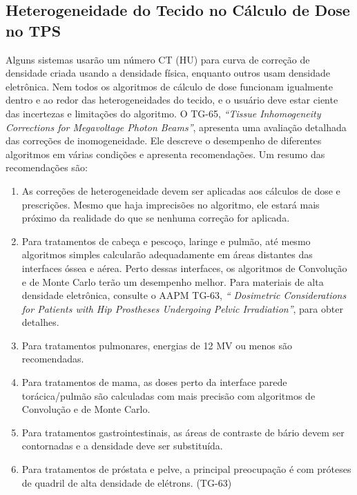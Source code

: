 \documentclass[11pt,a4paper]{article}
\begin{document}
\subsection*{Heterogeneidade do Tecido no Cálculo de Dose no TPS}

	Alguns sistemas usarão um número CT (HU) para curva de correção de densidade criada usando a densidade física, enquanto outros usam densidade eletrônica. Nem todos os algoritmos de cálculo de dose funcionam igualmente dentro e ao redor das heterogeneidades do tecido, e o usuário deve estar ciente das incertezas e limitações do algoritmo. O TG-65, \textit{``Tissue Inhomogeneity Corrections for Megavoltage Photon Beams''}, apresenta uma avaliação detalhada das correções de inomogeneidade. Ele descreve o desempenho de diferentes algoritmos em várias condições e apresenta recomendações. Um resumo das recomendações são:

	\begin{enumerate}[label=\textcolor{CarnationPink}{\roman*.}]
		\item As correções de heterogeneidade devem ser aplicadas aos cálculos de dose e prescrições. Mesmo que haja imprecisões no algoritmo, ele estará mais próximo da realidade do que se nenhuma correção for aplicada.
		
		\item Para tratamentos de cabeça e pescoço, laringe e pulmão, até mesmo algoritmos simples calcularão adequadamente em áreas distantes das interfaces óssea e aérea. Perto dessas interfaces, os algoritmos de Convolução e de Monte Carlo terão um desempenho melhor. Para materiais de alta densidade eletrônica, consulte o AAPM TG-63, \textit{`` Dosimetric Considerations for Patients with Hip Prostheses Undergoing Pelvic Irradiation''}, para obter detalhes.
		
		\item Para tratamentos pulmonares, energias de 12 MV ou menos são recomendadas.
		
		\item Para tratamentos de mama, as doses perto da interface parede torácica/pulmão são calculadas com mais precisão com algoritmos de Convolução e de Monte Carlo.
		
		\item Para tratamentos gastrointestinais, as áreas de contraste de bário devem ser contornadas e a densidade deve ser substituída.
		
		\item Para tratamentos de próstata e pelve, a principal preocupação é com próteses de quadril de alta densidade de elétrons. (TG-63)
	\end{enumerate}
\end{document}
